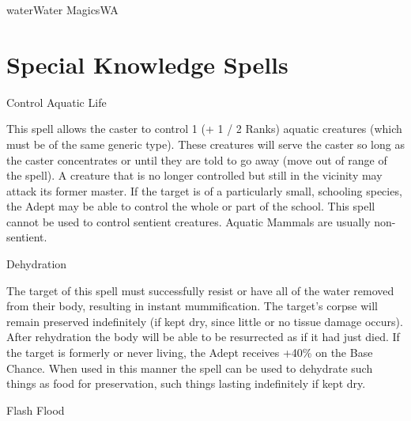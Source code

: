 \begin{College}[1.3]{water}{Water Magics}{WA}
\section{Special Knowledge Spells}

\begin{spell}[S-1]{Control Aquatic Life}

\begin{effects}
This spell allows the caster to control 1 (+ 1 / 2 Ranks) aquatic
creatures (which must be of the same generic type).  These creatures
will serve the caster so long as the caster concentrates or until they
are told to go away (move out of range of the spell).  A creature that
is no longer controlled but still in the vicinity may attack its
former master. If the target is of a particularly small, schooling
species, the Adept may be able to control the whole or part of the
school.  This spell cannot be used to control sentient creatures.
Aquatic Mammals are usually non-sentient.
\end{effects}
\end{spell}

\begin{spell}[S-2]{Dehydration}

\begin{effects}
The target of this spell must successfully resist or have all of the
water removed from their body, resulting in instant mummification.
The target’s corpse will remain preserved indefinitely (if kept dry,
since little or no tissue damage occurs). After rehydration the body
will be able to be resurrected as if it had just died.  If the target
is formerly or never living, the Adept receives +40\% on the Base
Chance. When used in this manner the spell can be used to dehydrate
such things as food for preservation, such things lasting indefinitely
if kept dry.
\end{effects}
\end{spell}

\begin{spell}[S-3]{Flash Flood}


\end{spell}
\end{College}
